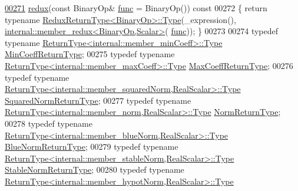 \begin{DoxyCode}
\hyperlink{group___core___module_a798df97b5445eb6370fe5c90be2f7962}{00271}     \hyperlink{group___core___module_a798df97b5445eb6370fe5c90be2f7962}{redux}(\textcolor{keyword}{const} BinaryOp& \hyperlink{structfunc}{func} = BinaryOp())\textcolor{keyword}{ const}
00272 \textcolor{keyword}{    }\{ \textcolor{keywordflow}{return} \textcolor{keyword}{typename} \hyperlink{group___core___module_class_eigen_1_1_partial_redux_expr}{ReduxReturnType<BinaryOp>::Type}(\_expression(), 
      \hyperlink{struct_eigen_1_1internal_1_1member__redux}{internal::member\_redux<BinaryOp,Scalar>}(
      \hyperlink{structfunc}{func})); \}
00273 
00274     \textcolor{keyword}{typedef} \textcolor{keyword}{typename} \hyperlink{group___core___module_class_eigen_1_1_partial_redux_expr}{ReturnType<internal::member\_minCoeff>::Type}
       \hyperlink{group___core___module_class_eigen_1_1_partial_redux_expr}{MinCoeffReturnType};
00275     \textcolor{keyword}{typedef} \textcolor{keyword}{typename} \hyperlink{group___core___module_class_eigen_1_1_partial_redux_expr}{ReturnType<internal::member\_maxCoeff>::Type}
       \hyperlink{group___core___module_class_eigen_1_1_partial_redux_expr}{MaxCoeffReturnType};
00276     \textcolor{keyword}{typedef} \textcolor{keyword}{typename} \hyperlink{group___core___module_class_eigen_1_1_partial_redux_expr}{ReturnType<internal::member\_squaredNorm,RealScalar>::Type}
       \hyperlink{group___core___module_class_eigen_1_1_partial_redux_expr}{SquaredNormReturnType};
00277     \textcolor{keyword}{typedef} \textcolor{keyword}{typename} \hyperlink{group___core___module_class_eigen_1_1_partial_redux_expr}{ReturnType<internal::member\_norm,RealScalar>::Type}
       \hyperlink{group___core___module_class_eigen_1_1_partial_redux_expr}{NormReturnType};
00278     \textcolor{keyword}{typedef} \textcolor{keyword}{typename} \hyperlink{group___core___module_class_eigen_1_1_partial_redux_expr}{ReturnType<internal::member\_blueNorm,RealScalar>::Type}
       \hyperlink{group___core___module_class_eigen_1_1_partial_redux_expr}{BlueNormReturnType};
00279     \textcolor{keyword}{typedef} \textcolor{keyword}{typename} \hyperlink{group___core___module_class_eigen_1_1_partial_redux_expr}{ReturnType<internal::member\_stableNorm,RealScalar>::Type}
       \hyperlink{group___core___module_class_eigen_1_1_partial_redux_expr}{StableNormReturnType};
00280     \textcolor{keyword}{typedef} \textcolor{keyword}{typename} \hyperlink{group___core___module_class_eigen_1_1_partial_redux_expr}{ReturnType<internal::member\_hypotNorm,RealScalar>::Type}

\end{DoxyCode}
